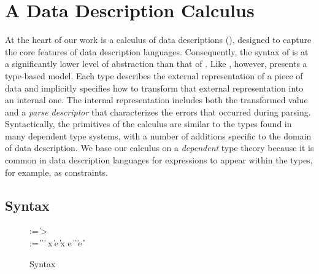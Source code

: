 \section{A Data Description Calculus}
\label{sec:ddc}

At the heart of our work is a calculus of data descriptions (\ddc{}),
designed to capture the core features of data description languages.
Consequently, the syntax of \ddc{} is at a significantly lower level
of abstraction than that of \ipads{}.  Like \ipads{}, however, \ddc{}
presents a type-based model.  Each \ddc{} type describes the external
representation of a piece of data and implicitly specifies how to
transform that external representation into an internal one.  The
internal representation includes both the transformed value and a
\textit{parse descriptor} that characterizes the errors that occurred
during parsing. Syntactically, the primitives of the calculus are
similar to the types found in many dependent type systems, with a
number of additions specific to the domain of data description.
We base our calculus on a \textit{dependent} type theory because it is
common in data description languages for expressions to appear within
the types, for example, as constraints.


\subsection{\ddc{} Syntax}
\begin{figure}
{\small
\begin{bnf}
   \meta{\gk} \::= \kty \| \ity \-> \gk 
                               \pext{\| \gk \-> \gk} \\
   \meta{\ty} \::= 
    \ptrue\| \pfalse \|  \| 
    \plam{\var}{\ity}{\ty} \|  \nlalt
    \psig x \ty \ty \| \psum \ty e \ty \| \pand \ty \ty \|
    \pset x \ty e \| \pseq \ty {} \nlalt
    \ptyvar       \| \pmu{\ptyvar}{\ty} \| \pcompute e \ity \| \pabsorb \ty \| \pscan{\ty} 
\end{bnf}
}
\caption{\ddc{} Syntax}
\label{fig:ddc-syntax}
\end{figure}

